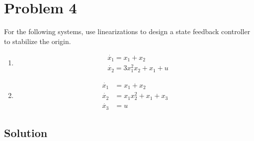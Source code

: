 \section*{Problem 4}

For the following systems, use linearizations to design a state feedback controller to stabilize the origin.
\begin{enumerate}[label= (\alph*), topsep=3pt, itemsep=-1em]
    \item \begin{align*}
               & \dot{x_{1}}=x_{1}+x_{2}               \\
               & \dot{x_{2}}=3 x_{1}^{2} x_{2}+x_{1}+u
          \end{align*}
          \vspace*{-1.5em}

    \item \begin{align*}
              \dot{x_{1}} & =x_{1}+x_{2}                 \\
              \dot{x_{2}} & =x_{1} x_{2}^{2}+x_{1}+x_{3} \\
              \dot{x_{3}} & =u
          \end{align*}
\end{enumerate}
\vspace*{-3em}

\subsection*{Solution}

